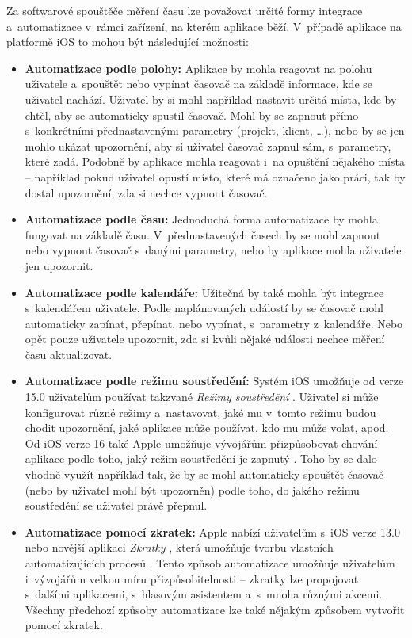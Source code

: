Za softwarové spouštěče měření času lze považovat určité formy integrace a~automatizace v~rámci zařízení, na kterém aplikace běží. V~případě aplikace na platformě iOS to mohou být následující možnosti:
\begin{itemize}
\item\textbf{Automatizace podle polohy:} Aplikace by mohla reagovat na polohu uživatele a~spouštět nebo vypínat časovač na základě informace, kde se uživatel nachází. Uživatel by si mohl například nastavit určitá místa, kde by chtěl, aby se automaticky spustil časovač. Mohl by se zapnout přímo s~konkrétními přednastavenými parametry (projekt, klient, \dots), nebo by se jen mohlo ukázat upozornění, aby si uživatel časovač zapnul sám, s~parametry, které zadá. Podobně by aplikace mohla reagovat i~na opuštění nějakého místa – například pokud uživatel opustí místo, které má označeno jako práci, tak by dostal upozornění, zda si nechce vypnout časovač.
\item\textbf{Automatizace podle času:} Jednoduchá forma automatizace by mohla fungovat na základě času. V~přednastavených časech by se mohl zapnout nebo vypnout časovač s~danými parametry, nebo by aplikace mohla uživatele jen upozornit.
\item\textbf{Automatizace podle kalendáře:} Užitečná by také mohla být integrace s~kalendářem uživatele. Podle naplánovaných událostí by se časovač mohl automaticky zapínat, přepínat, nebo vypínat, s~parametry z~kalendáře. Nebo opět pouze uživatele upozornit, zda si kvůli nějaké události nechce měření času aktualizovat.
\item\textbf{Automatizace podle režimu soustředění:} Systém iOS umožňuje od verze 15.0 uživatelům používat takzvané \emph{Režimy soustředění} \cite{ios-focus-modes}. Uživatel si může konfigurovat různé režimy a~nastavovat, jaké mu v~tomto režimu budou chodit upozornění, jaké aplikace může používat, kdo mu může volat, apod. Od iOS verze 16 také Apple umožňuje vývojářům přizpůsobovat chování aplikace podle toho, jaký režim soustředění je zapnutý \cite{ios-focus-modes-adjustment}. Toho by se dalo vhodně využít například tak, že by se mohl automaticky spouštět časovač (nebo by uživatel mohl být upozorněn) podle toho, do jakého režimu soustředění se uživatel právě přepnul.
\item\textbf{Automatizace pomocí zkratek:} Apple nabízí uživatelům s~iOS verze 13.0 nebo novější aplikaci \emph{Zkratky} \cite{ios-shortcuts-app}, která umožňuje tvorbu vlastních automatizujících procesů \cite{ios-shortcuts}. Tento způsob automatizace umožňuje uživatelům i~vývojářům velkou míru přizpůsobitelnosti – zkratky lze propojovat s~dalšími aplikacemi, s~hlasovým asistentem a~s~mnoha různými akcemi. Všechny předchozí způsoby automatizace lze také nějakým způsobem vytvořit pomocí zkratek. \cite{ios-shortcuts-developer}
\end{itemize}


